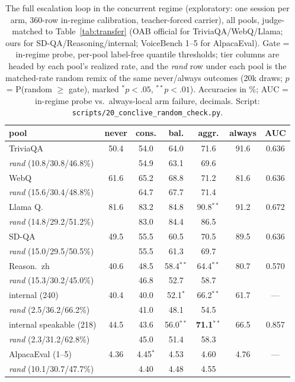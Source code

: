 \begin{table}[h]
\centering\footnotesize
\setlength{\tabcolsep}{4pt}
\caption{The full escalation loop in the concurrent regime
(exploratory: one session per arm, 360-row in-regime
calibration, teacher-forced carrier), all pools, judge-matched to
Table~\ref{tab:transfer} (OAB official for TriviaQA/WebQ/Llama; ours
for SD-QA/Reasoning/internal; VoiceBench 1--5 for AlpacaEval). Gate =
in-regime probe, per-pool label-free quantile thresholds; tier columns
are headed by each pool's realized rate, and the \emph{rand}
row under each pool is the matched-rate random remix of the same
never/always outcomes (20k draws; $p$ = P(random $\ge$ gate), marked
$^{*}p{<}.05$, $^{**}p{<}.01$). Accuracies in \%; AUC = in-regime
probe vs.\ always-local arm failure, decimals.
Script: \texttt{scripts/20\_conclive\_random\_check.py}.}
\label{tab:conclive}
\begin{tabular}{lcccccc}
\toprule
pool & never & cons. & bal. & aggr. & always & AUC \\
\midrule
TriviaQA & 50.4 & 54.0 & 64.0 & 71.6 & 91.6 & 0.636 \\
\;\emph{rand} (10.8/30.8/46.8\%) & & 54.9 & 63.1 & 69.6 & & \\
WebQ & 61.6 & 65.2 & 68.8 & 71.2 & 81.6 & 0.636 \\
\;\emph{rand} (15.6/30.4/48.8\%) & & 64.7 & 67.7 & 71.4 & & \\
Llama Q. & 81.6 & 83.2 & 84.8 & 90.8$^{**}$ & 91.2 & 0.672 \\
\;\emph{rand} (14.8/29.2/51.2\%) & & 83.0 & 84.4 & 86.5 & & \\
SD-QA & 49.5 & 55.5 & 60.5 & 70.5 & 89.5 & 0.636 \\
\;\emph{rand} (15.0/29.5/50.5\%) & & 55.5 & 61.3 & 69.7 & & \\
Reason.\ zh & 40.6 & 48.5 & 58.4$^{**}$ & 64.4$^{**}$ & 80.7 & 0.570 \\
\;\emph{rand} (15.3/30.2/45.0\%) & & 46.8 & 52.7 & 58.7 & & \\
\midrule
internal (240) & 40.4 & 40.0 & 52.1$^{*}$ & 66.2$^{**}$ & 61.7 & --- \\
\;\emph{rand} (2.5/36.2/66.2\%) & & 41.0 & 48.1 & 54.5 & & \\
internal speakable (218) & 44.5 & 43.6 & 56.0$^{**}$ & \textbf{71.1}$^{**}$ & 66.5 & 0.857 \\
\;\emph{rand} (2.3/31.2/62.8\%) & & 45.0 & 51.4 & 58.3 & & \\
AlpacaEval (1--5) & 4.36 & 4.45$^{*}$ & 4.53 & 4.60 & 4.76 & --- \\
\;\emph{rand} (10.1/30.7/47.7\%) & & 4.40 & 4.48 & 4.55 & & \\
\bottomrule
\end{tabular}
\end{table}

